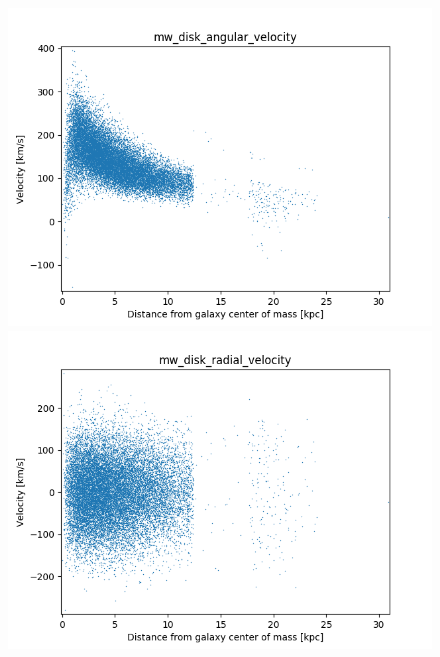 \documentclass[a4paper,12pt, english]{article}
\begin{document}
\begin{figure}
\centering
\begin{minipage}{0.45\textwidth}
  \centering
\includegraphics[width=1\textwidth]{VelocityDistr/mw_disk_angular_velocity.png}
\end{minipage}
\begin{minipage}{0.45\textwidth}
  \centering
\includegraphics[width=1\textwidth]{VelocityDistr/mw_disk_radial_velocity.png}
\end{minipage}
\begin{minipage}{0.45\textwidth}
  \centering

\end{minipage}
\end{figure}
\end{document}
